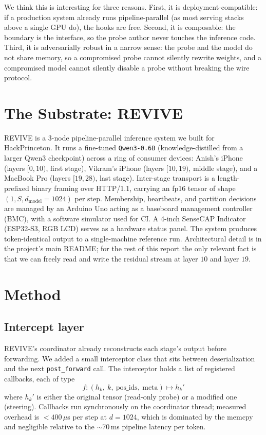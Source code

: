 \documentclass[11pt]{article}
\begin{document}
We think this is interesting for three reasons. First, it is deployment-compatible: if a production system already runs pipeline-parallel (as most serving stacks above a single GPU do), the hooks are free. Second, it is composable: the boundary is the interface, so the probe author never touches the inference code. Third, it is adversarially robust in a narrow sense: the probe and the model do not share memory, so a compromised probe cannot silently rewrite weights, and a compromised model cannot silently disable a probe without breaking the wire protocol.

\section{The Substrate: REVIVE}

REVIVE is a 3-node pipeline-parallel inference system we built for HackPrinceton. It runs a fine-tuned \texttt{Qwen3-0.6B} (knowledge-distilled from a larger Qwen3 checkpoint) across a ring of consumer devices: Anish's iPhone (layers $[0,10)$, first stage), Vikram's iPhone (layers $[10,19)$, middle stage), and a MacBook Pro (layers $[19,28)$, last stage). Inter-stage transport is a length-prefixed binary framing over HTTP/1.1, carrying an fp16 tensor of shape $(1, S, d_\text{model}{=}1024)$ per step. Membership, heartbeats, and partition decisions are managed by an Arduino Uno acting as a baseboard management controller (BMC), with a software simulator used for CI. A 4-inch SenseCAP Indicator (ESP32-S3, RGB LCD) serves as a hardware status panel. The system produces token-identical output to a single-machine reference run. Architectural detail is in the project's main README; for the rest of this report the only relevant fact is that we can freely read and write the residual stream at layer $10$ and layer $19$.

\section{Method}

\subsection{Intercept layer}

REVIVE's coordinator already reconstructs each stage's output before forwarding. We added a small interceptor class that sits between deserialization and the next \texttt{post\_forward} call. The interceptor holds a list of registered callbacks, each of type
\begin{equation*}
    f: (h_k,\ k,\ \text{pos\_ids},\ \text{meta}) \mapsto h_k'
\end{equation*}
where $h_k'$ is either the original tensor (read-only probe) or a modified one (steering). Callbacks run synchronously on the coordinator thread; measured overhead is $<400\,\mu$s per step at $d=1024$, which is dominated by the memcpy and negligible relative to the $\sim$70\,ms pipeline latency per token.
\end{document}

